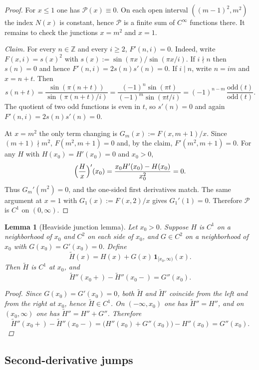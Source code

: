 \documentclass[11pt,a4paper]{amsart}
\theoremstyle{plain}
\newtheorem{lemma}[theorem]{Lemma}
\theoremstyle{definition}
\theoremstyle{remark}
\begin{document}
\begin{proof}
For $x\le 1$ one has $\mathcal P(x)\equiv 0$. On each open interval $((m-1)^2,m^2)$ the index $N(x)$ is constant, hence $\mathcal P$ is a finite sum of $C^\infty$ functions there. It remains to check the junctions $x=m^2$ and $x=1$.

\emph{Claim.} For every $n\in\mathbb Z$ and every $i\ge 2$, $F'(n,i)=0$. Indeed, write $F(x,i)=s(x)^2$ with $s(x):=\sin(\pi x)/\sin(\pi x/i)$. If $i\nmid n$ then $s(n)=0$ and hence $F'(n,i)=2s(n)s'(n)=0$. If $i\mid n$, write $n=im$ and $x=n+t$. Then
\[
s(n+t)=\frac{\sin(\pi(n+t))}{\sin(\pi(n+t)/i)}
=\frac{(-1)^n\sin(\pi t)}{(-1)^m\sin(\pi t/i)}
=(-1)^{n-m}\,\frac{\text{odd}(t)}{\text{odd}(t)}.
\]
The quotient of two odd functions is even in $t$, so $s'(n)=0$ and again $F'(n,i)=2s(n)s'(n)=0$.

At $x=m^2$ the only term changing is $G_m(x):=F(x,m{+}1)/x$. Since $(m{+}1)\nmid m^2$, $F(m^2,m{+}1)=0$ and, by the claim, $F'(m^2,m{+}1)=0$. For any $H$ with $H(x_0)=H'(x_0)=0$ and $x_0>0$,
\[
\Bigl(\frac{H}{x}\Bigr)'(x_0)=\frac{x_0H'(x_0)-H(x_0)}{x_0^2}=0.
\]
Thus $G_m'(m^2)=0$, and the one-sided first derivatives match. The same argument at $x=1$ with $G_1(x):=F(x,2)/x$ gives $G_1'(1)=0$. Therefore $\mathcal P$ is $C^1$ on $(0,\infty)$.
\end{proof}


\begin{lemma}[Heaviside junction lemma]\label{lem:heaviside-junction}
Let $x_0>0$. Suppose $H$ is $C^1$ on a neighborhood of $x_0$ and $C^2$ on each side of $x_0$, and $G\in C^2$ on a neighborhood of $x_0$ with $G(x_0)=G'(x_0)=0$. Define
\[
\widetilde H(x)=H(x)+G(x)\,\mathbf 1_{[x_0,\infty)}(x).
\]
Then $\widetilde H$ is $C^1$ at $x_0$, and
\[
\widetilde H''(x_0{+})-\widetilde H''(x_0{-})=G''(x_0).
\]

\begin{proof}
Since $G(x_0)=G'(x_0)=0$, both $\widetilde H$ and $\widetilde H'$ coincide from the left and from the right at $x_0$, hence $\widetilde H\in C^1$. On $(-\infty,x_0)$ one has $\widetilde H''=H''$, and on $(x_0,\infty)$ one has $\widetilde H''=H''+G''$. Therefore
\[
\widetilde H''(x_0{+})-\widetilde H''(x_0{-})=\bigl(H''(x_0)+G''(x_0)\bigr)-H''(x_0)=G''(x_0).
\]
\end{proof}
\end{lemma}

\subsection{Second-derivative jumps}
\end{document}

